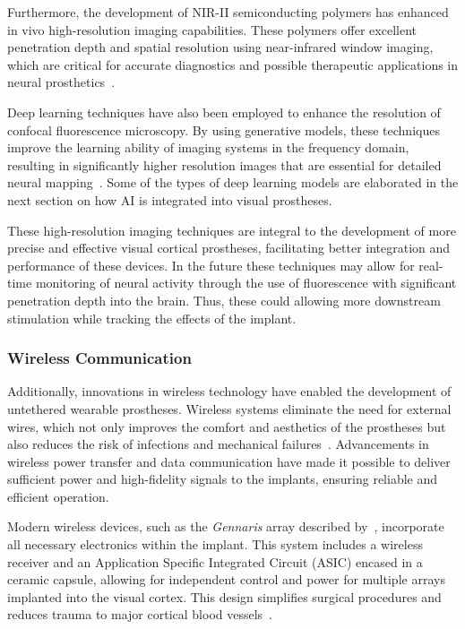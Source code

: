 \documentclass[twocolumn,10pt]{article}
\begin{document}
Furthermore, the development of NIR-II semiconducting polymers has enhanced in
vivo high-resolution imaging capabilities. These polymers offer excellent
penetration depth and spatial resolution using near-infrared window imaging,
which are critical for accurate diagnostics and possible therapeutic
applications in neural
prosthetics~\parencite{wangRecentProgressSecond2023,kangNIRIISemiconductingPolymers2023}.

Deep learning techniques have also been employed to enhance the resolution of
confocal fluorescence microscopy. By using generative models, these techniques
improve the learning ability of imaging systems in the frequency domain,
resulting in significantly higher resolution images that are essential for
detailed neural mapping~\parencite{huangEnhancingImageResolution2023}. Some of
the types of deep learning models are elaborated in the next section on how AI
is integrated into visual prostheses.

These high-resolution imaging techniques are integral to the development of more
precise and effective visual cortical prostheses, facilitating better
integration and performance of these devices. In the future these techniques may
allow for real-time monitoring of neural activity through the use of
fluorescence with significant penetration depth into the brain. Thus, these
could allowing more downstream stimulation while tracking the effects of the
implant.

\subsubsection*{Wireless Communication}
Additionally, innovations in wireless technology have enabled the development of
untethered wearable prostheses. Wireless systems eliminate the need for external
wires, which not only improves the comfort and aesthetics of the prostheses but
also reduces the risk of infections and mechanical
failures~\parencite{bruntonOptimisingElectrodeSurface2013}. Advancements in
wireless power transfer and data communication have made it possible to deliver
sufficient power and high-fidelity signals to the implants, ensuring reliable
and efficient operation.

Modern wireless devices, such as the \textit{Gennaris} array described
by~\textcite{rosenfeldTissueResponseChronically2020}, incorporate all necessary
electronics within the implant. This system includes a wireless receiver and an
Application Specific Integrated Circuit (ASIC) encased in a ceramic capsule,
allowing for independent control and power for multiple arrays implanted into
the visual cortex. This design simplifies surgical procedures and reduces trauma
to major cortical blood vessels~\parencite{polikovResponseBrainTissue2005}.
\end{document}
